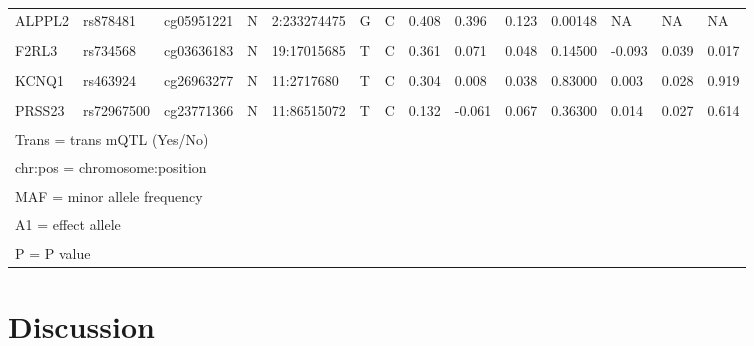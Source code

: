 \documentclass[11pt,oneside]{bristolthesis}
\begin{document}
\begin{table}[!h]
{\begin{tabular}[t]{llllllllllllll}
\addlinespace
ALPPL2 & rs878481 & cg05951221 & N & 2:233274475 & G & C & 0.408 & 0.396 & 0.123 & 0.00148 & NA & NA & NA\\
\cellcolor{gray!6}{ALPPL2} & \cellcolor{gray!6}{rs3748971} & \cellcolor{gray!6}{cg21566642} & \cellcolor{gray!6}{N} & \cellcolor{gray!6}{2:233285872} & \cellcolor{gray!6}{T} & \cellcolor{gray!6}{C} & \cellcolor{gray!6}{0.074} & \cellcolor{gray!6}{0.257} & \cellcolor{gray!6}{0.065} & \cellcolor{gray!6}{0.00011} & \cellcolor{gray!6}{NA} & \cellcolor{gray!6}{NA} & \cellcolor{gray!6}{NA}\\
F2RL3 & rs734568 & cg03636183 & N & 19:17015685 & T & C & 0.361 & 0.071 & 0.048 & 0.14500 & -0.093 & 0.039 & 0.017\\
\cellcolor{gray!6}{GFI1} & \cellcolor{gray!6}{rs17518433} & \cellcolor{gray!6}{cg09935388} & \cellcolor{gray!6}{N} & \cellcolor{gray!6}{1:92599172} & \cellcolor{gray!6}{A} & \cellcolor{gray!6}{T} & \cellcolor{gray!6}{0.236} & \cellcolor{gray!6}{0.114} & \cellcolor{gray!6}{0.052} & \cellcolor{gray!6}{0.03130} & \cellcolor{gray!6}{-0.001} & \cellcolor{gray!6}{0.036} & \cellcolor{gray!6}{0.986}\\
KCNQ1 & rs463924 & cg26963277 & N & 11:2717680 & T & C & 0.304 & 0.008 & 0.038 & 0.83000 & 0.003 & 0.028 & 0.919\\
\addlinespace
\cellcolor{gray!6}{PRSS23} & \cellcolor{gray!6}{rs1939110} & \cellcolor{gray!6}{cg11660018} & \cellcolor{gray!6}{N} & \cellcolor{gray!6}{11:86505120} & \cellcolor{gray!6}{T} & \cellcolor{gray!6}{C} & \cellcolor{gray!6}{0.286} & \cellcolor{gray!6}{-0.151} & \cellcolor{gray!6}{0.092} & \cellcolor{gray!6}{0.10100} & \cellcolor{gray!6}{0.026} & \cellcolor{gray!6}{0.042} & \cellcolor{gray!6}{0.534}\\
PRSS23 & rs72967500 & cg23771366 & N & 11:86515072 & T & C & 0.132 & -0.061 & 0.067 & 0.36300 & 0.014 & 0.027 & 0.614\\
\bottomrule
\multicolumn{14}{l}{\textsuperscript{} Trans = trans mQTL (Yes/No)}\\
\multicolumn{14}{l}{\textsuperscript{} chr:pos = chromosome:position}\\
\multicolumn{14}{l}{\textsuperscript{} MAF = minor allele frequency}\\
\multicolumn{14}{l}{\textsuperscript{} A1 = effect allele}\\
\multicolumn{14}{l}{\textsuperscript{} P = P value}\\
\end{tabular}}
\end{table}
\hypertarget{discussion-07}{%
\section{Discussion}\label{discussion-07}}
\end{document}
